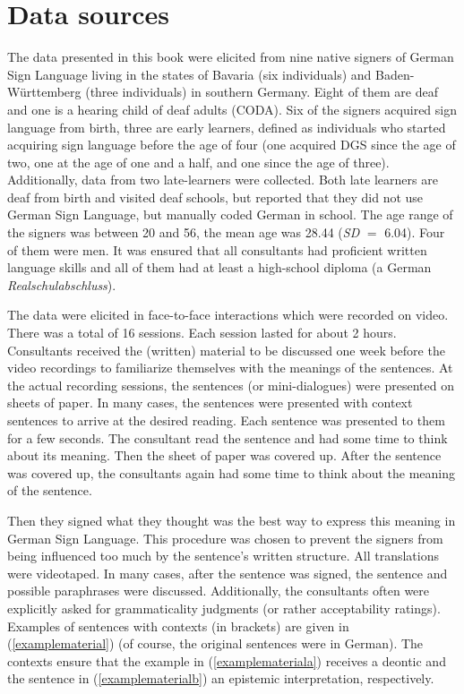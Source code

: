 \section{Data sources}\label{methods}
The data presented in this book were elicited from nine native signers of German Sign Language living in the states of Bavaria (six individuals) and Baden-Württemberg (three individuals) in southern Germany. Eight of them are deaf and one is a hearing child of deaf adults (CODA). Six of the signers acquired sign language from birth, three are early learners, defined as individuals who started acquiring sign language before the age of four (one acquired DGS since the age of two, one at the age of one and a half, and one since the age of three). Additionally, data from two late-learners were collected. Both late learners are deaf from birth and visited deaf schools, but reported that they did not use German Sign Language, but manually coded German in school. The age range of the signers was between 20 and 56, the mean age was 28.44 (\textit{SD} $=$ 6.04). Four of them were men. It was ensured that all consultants had proficient written language skills and all of them had at least a high-school diploma (a German \textit{Realschulabschluss}). 



The data were elicited in face-to-face interactions which were recorded on video. There was a total of 16 sessions. Each session lasted for about 2 hours. Consultants received the (written) material to be discussed one week before the video recordings to familiarize themselves with the meanings of the sentences. At the actual recording sessions, the sentences (or mini-dialogues) were presented on sheets of paper. In many cases, the sentences were presented with context sentences to arrive at the desired reading. Each sentence was presented to them for a few seconds. The consultant read the sentence and had some time to think about its meaning. Then the sheet of paper was covered up. After the sentence was covered up, the consultants again had some time to think about the meaning of the sentence. 

\largerpage
Then they signed what they thought was the best way to express this meaning in German Sign Language. This procedure was chosen to prevent the  signers  from  being  influenced  too  much  by  the  sentence's  written  structure. All translations were videotaped. In many cases, after the sentence was signed, the sentence and possible paraphrases were discussed. Additionally, the  consultants often were explicitly asked for grammaticality judgments (or rather acceptability ratings). Examples of sentences with contexts (in brackets) are given in (\ref{examplematerial}) (of course, the original sentences were in German). The contexts ensure that the example in (\ref{examplemateriala}) receives a deontic and the sentence in (\ref{examplematerialb}) an epistemic interpretation, respectively.

